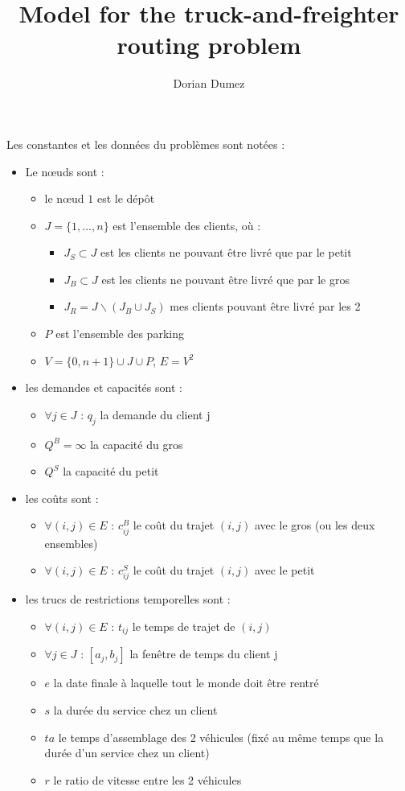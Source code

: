 \documentclass[12pt,a4paper,fleqn]{article}
\title{Model for the truck-and-freighter routing problem}
\author{Dorian Dumez}
\begin{document}
\maketitle

Les constantes et les données du problèmes sont notées :
\begin{itemize}
\item Le nœuds sont :
\begin{itemize}
\item le nœud $1$ est le dépôt 
\item $J = \{1,...,n\}$ est l'ensemble des clients, où :
\begin{itemize}
\item $J_S \subset J$ est les clients ne pouvant être livré que par le petit
\item $J_B \subset J$ est les clients ne pouvant être livré que par le gros
\item $J_R = J \backslash (J_B \cup J_S)$ mes clients pouvant être livré par les 2
\end{itemize}
\item $P$ est l'ensemble des parking
\item $V = \{0, n+1\} \cup J \cup P$, $E = V^2$
\end{itemize}
\item les demandes et capacités sont :
\begin{itemize}
\item $\forall j \in J \text{ : } q_j$ la demande du client j
\item $Q^B = \infty$ la capacité du gros
\item $Q^S$ la capacité du petit
\end{itemize}
\item les coûts sont :
\begin{itemize}
\item $\forall (i,j) \in E \text{ : } c^B_{ij}$ le coût du trajet $(i,j)$ avec le gros (ou les deux ensembles)
\item $\forall (i,j) \in E \text{ : } c^S_{ij}$ le coût du trajet $(i,j)$ avec le petit
\end{itemize} 
\item les trucs de restrictions temporelles sont :
\begin{itemize}
\item $\forall (i,j) \in E \text{ : } t_{ij}$ le temps de trajet de $(i,j)$
\item $\forall j \in J \text{ : } [a_j,b_j]$ la fenêtre de temps du client j
\item $e$ la date finale à laquelle tout le monde doit être rentré
\item $s$ la durée du service chez un client
\item $ta$ le temps d'assemblage des 2 véhicules (fixé au même temps que la durée d'un service chez un client)
\item $r$ le ratio de vitesse entre les 2 véhicules
\end{itemize}
\end{itemize}
\end{document}
